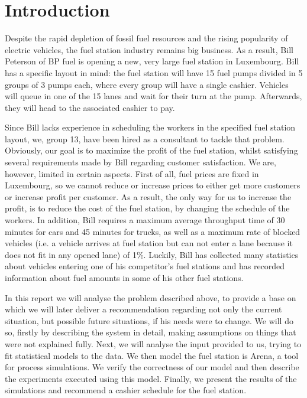 \section{Introduction}
Despite the rapid depletion of fossil fuel resources and the rising popularity of electric vehicles, the fuel station industry remains big business.
As a result, Bill Peterson of BP fuel is opening a new, very large fuel station in Luxembourg.
Bill has a specific layout in mind: the fuel station will have 15 fuel pumps divided in 5 groups of 3 pumps each, where every group will have a single cashier.
Vehicles will queue in one of the 15 lanes and wait for their turn at the pump.
Afterwards, they will head to the associated cashier to pay.

Since Bill lacks experience in scheduling the workers in the specified fuel station layout, we, group 13, have been hired as a consultant to tackle that problem.
Obviously, our goal is to maximize the profit of the fuel station, whilst satisfying several requirements made by Bill regarding customer satisfaction.
We are, however, limited in certain aspects.
First of all, fuel prices are fixed in Luxembourg, so we cannot reduce or increase prices to either get more customers or increase profit per customer.
As a result, the only way for us to increase the profit, is to reduce the cost of the fuel station, by changing the schedule of the workers.
In addition, Bill requires a maximum average throughput time of 30 minutes for cars and 45 minutes for trucks, as well as a maximum rate of blocked vehicles (i.e. a vehicle arrives at fuel station but can not enter a lane because it does not fit in any opened lane) of 1\%.
Luckily, Bill has collected many statistics about vehicles entering one of his competitor's fuel stations and has recorded information about fuel amounts in some of his other fuel stations.

In this report we will analyse the problem described above, to provide a base on which we will later deliver a recommendation regarding not only the current situation, but possible future situations, if his needs were to change.
We will do so, firstly by describing the system in detail, making assumptions on things that were not explained fully.
Next, we will analyse the input provided to us, trying to fit statistical models to the data.
We then model the fuel station is Arena, a tool for process simulations.
We verify the correctness of our model and then describe the experiments executed using this model.
Finally, we present the results of the simulations and recommend a cashier schedule for the fuel station.
